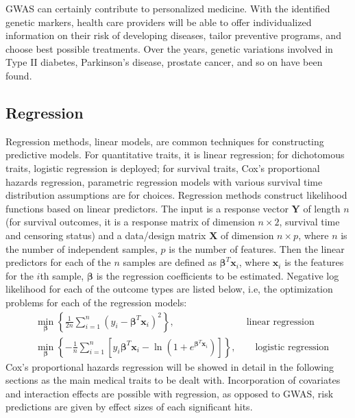 GWAS can certainly contribute to personalized medicine. With the identified genetic markers, health care providers will be able to offer individualized information on their risk of developing diseases, tailor preventive programs, and choose best possible treatments. Over the years, genetic variations involved in Type II diabetes, Parkinson's disease, prostate cancer, and so on have been found.

\subsection{Regression}
Regression methods, linear models, are common techniques for constructing predictive models. For quantitative traits, it is linear regression; for dichotomous traits, logistic regression is deployed; for survival traits, Cox's proportional hazards regression, parametric regression models with various survival time distribution assumptions are for choices. Regression methods construct likelihood functions based on linear predictors. The input is a response vector $\bm{Y}$ of length $n$ (for survival outcomes, it is a response matrix of dimension $n \times 2$, survival time and censoring status) and a data/design matrix $\bm{X}$ of dimension $n \times p$, where $n$ is the number of independent samples, $p$ is the number of features. Then the linear predictors for each of the $n$ samples are defined as $\bm{\beta}^T\bm{x}_i$, where $\bm{x}_i$ is the features for the $i$th sample, $\bm{\beta}$ is the regression coefficients to be estimated. Negative log likelihood for each of the outcome types are listed below, i.e, the optimization problems for each of the regression models:
\begin{align}
    &\min_{\bm{\beta}} \left\{\frac{1}{2n} \sum_{i=1}^{n} (y_i-\bm{\beta}^T\bm{x}_i)^2 \right\}, \qquad\qquad\qquad\quad\;\: \text{linear regression} \label{eq1.1} \\
    &\min_{\bm{\beta}} \left\{-\frac{1}{n} \sum_{i=1}^{n} \left[y_i\bm{\beta}^T\bm{x}_i-\ln(1+e^{\bm{\beta}^T\bm{x}_i})\right]\right\}, \qquad \text{logistic regression} \label{eq1.2}
\end{align}
Cox's proportional hazards regression will be showed in detail in the following sections as the main medical traits to be dealt with. Incorporation of covariates and interaction effects are possible with regression, as opposed to GWAS, risk predictions are given by effect sizes of each significant hits.

